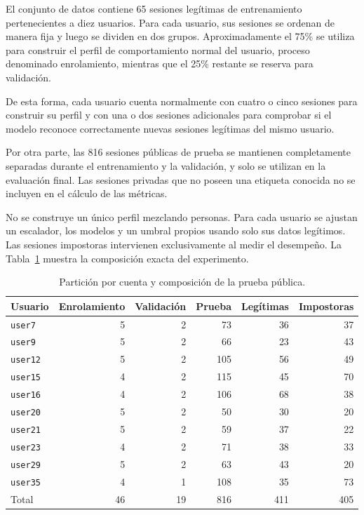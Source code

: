 \documentclass[11pt,letterpaper]{article}
\begin{document}
El conjunto de datos contiene 65 sesiones legítimas de entrenamiento pertenecientes a diez usuarios.
Para cada usuario, sus sesiones se ordenan de manera fija y luego se dividen en dos grupos.
Aproximadamente el 75\% se utiliza para construir el perfil de comportamiento normal del usuario,
proceso denominado enrolamiento, mientras que el 25\% restante se reserva para validación.

De esta forma, cada usuario cuenta normalmente con cuatro o cinco sesiones para construir su perfil y
con una o dos sesiones adicionales para comprobar si el modelo reconoce correctamente nuevas sesiones legítimas
del mismo usuario.

Por otra parte, las 816 sesiones públicas de prueba se mantienen completamente separadas durante el entrenamiento
y la validación, y solo se utilizan en la evaluación final.
Las sesiones privadas que no poseen una etiqueta conocida no se incluyen en el cálculo de las métricas.

No se construye un único perfil mezclando personas. Para cada usuario se ajustan un escalador, los modelos y un umbral
propios usando solo sus datos legítimos. Las sesiones impostoras intervienen exclusivamente al medir el desempeño. La
Tabla~\ref{tab:cohorte} muestra la composición exacta del experimento.

\begin{table}[htbp]
  \centering

  \small
  \begin{tabular}{lrrrrr}
    \toprule
    Usuario & Enrolamiento & Validación & Prueba & Legítimas & Impostoras \\
    \midrule
    \texttt{user7}  & 5 & 2 & 73  & 36 & 37 \\
    \texttt{user9}  & 5 & 2 & 66  & 23 & 43 \\
    \texttt{user12} & 5 & 2 & 105 & 56 & 49 \\
    \texttt{user15} & 4 & 2 & 115 & 45 & 70 \\
    \texttt{user16} & 4 & 2 & 106 & 68 & 38 \\
    \texttt{user20} & 5 & 2 & 50  & 30 & 20 \\
    \texttt{user21} & 5 & 2 & 59  & 37 & 22 \\
    \texttt{user23} & 4 & 2 & 71  & 38 & 33 \\
    \texttt{user29} & 5 & 2 & 63  & 43 & 20 \\
    \texttt{user35} & 4 & 1 & 108 & 35 & 73 \\
    \midrule
    Total & 46 & 19 & 816 & 411 & 405 \\
    \bottomrule
  \end{tabular}
  \caption{Partición por cuenta y composición de la prueba pública.}
  \label{tab:cohorte}
\end{table}
\end{document}
